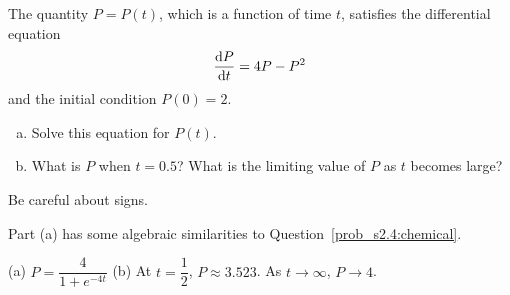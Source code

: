 \begin{question}[1997D]
 The quantity $P=P(t)$, which is a function of time $t$,
satisfies the differential equation
\begin{align*}
\diff{P}{t}=4P-P^2
\end{align*}
and the initial condition $P(0)=2$.


\begin{enumerate}[(a)]
\item
Solve this equation for $P(t)$.

\item
What is $P$ when $t=0.5$? What is the limiting value of $P$
as $t$ becomes large?

\end{enumerate}
\end{question}

\begin{hint}
Be careful about signs.

Part (a) has some algebraic similarities to Question~\ref{prob_s2.4:chemical}.
\end{hint}

\begin{answer}
(a)
 $P=\dfrac{4}{1+e^{-4t}}$
\qquad (b)
 At $t=\dfrac{1}{2}$, $P\approx 3.523$.
As $t\rightarrow\infty$, $P\rightarrow 4$.

\end{answer}

